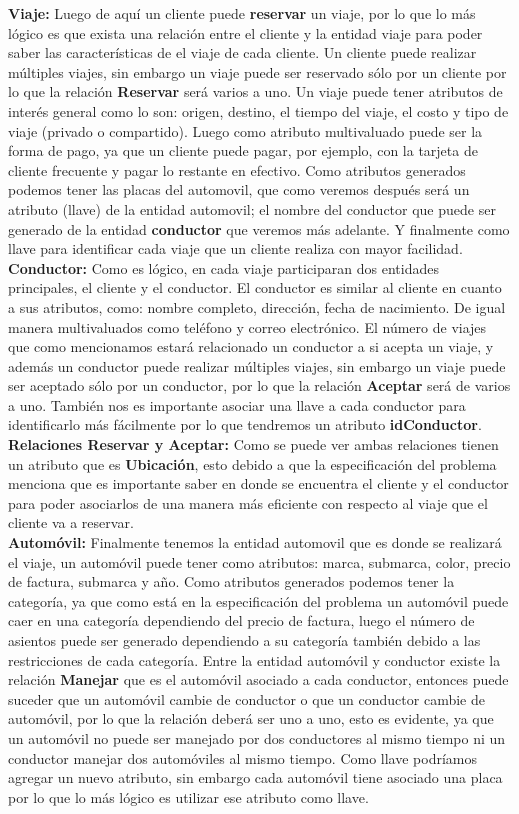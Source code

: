 \documentclass{article}
\begin{document}
\textbf{Viaje:} Luego de aquí un cliente puede \textbf{reservar} un viaje, por lo que lo más lógico es que exista una relación entre el cliente y la entidad viaje para poder saber las características de el viaje de cada cliente. Un cliente puede realizar múltiples viajes, sin embargo un viaje puede ser reservado sólo por un cliente por lo que la relación \textbf{Reservar} será varios a uno. Un viaje puede tener atributos de interés general como lo son: origen, destino, el tiempo del viaje, el costo y tipo de viaje (privado o compartido). Luego como atributo multivaluado puede ser la forma de pago, ya que un cliente puede pagar, por ejemplo, con la tarjeta de cliente frecuente y pagar lo restante en efectivo. Como atributos generados podemos tener las placas del automovil, que como veremos después será un atributo (llave) de la entidad automovil; el nombre del conductor que puede ser generado de la entidad \textbf{conductor} que veremos más adelante. Y finalmente como llave para identificar cada viaje que un cliente realiza con mayor facilidad.\\
\textbf{Conductor:} Como es lógico, en cada viaje participaran dos entidades principales, el cliente y el conductor. El conductor es similar al cliente en cuanto a sus atributos, como: nombre completo, dirección, fecha de nacimiento. De igual manera multivaluados como teléfono y correo electrónico. El número de viajes que como mencionamos estará relacionado un conductor a si acepta un viaje, y además un conductor puede realizar múltiples viajes, sin embargo un viaje puede ser aceptado sólo por un conductor, por lo que la relación \textbf{Aceptar} será de varios a uno. También nos es importante asociar una llave a cada conductor para identificarlo más fácilmente por lo que tendremos un atributo \textbf{idConductor}.\\
\textbf{Relaciones Reservar y Aceptar:} Como se puede ver ambas relaciones tienen un atributo que es \textbf{Ubicación}, esto debido a que la especificación del problema menciona que es importante saber en donde se encuentra el cliente y el conductor para poder asociarlos de una manera más eficiente con respecto al viaje que el cliente va a reservar.\\
\textbf{Automóvil:} Finalmente tenemos la entidad automovil que es donde se realizará el viaje, un automóvil puede tener como atributos: marca, submarca, color, precio de factura, submarca y año. Como atributos generados podemos tener la categoría, ya que como está en la especificación del problema un automóvil puede caer en una categoría dependiendo del precio de factura, luego el número de asientos puede ser generado dependiendo a su categoría también debido a las restricciones de cada categoría. Entre la entidad automóvil y conductor existe la relación \textbf{Manejar} que es el automóvil asociado a cada conductor, entonces puede suceder que un automóvil cambie de conductor o que un conductor cambie de automóvil, por lo que la relación deberá ser uno a uno, esto es evidente, ya que un automóvil no puede ser manejado por dos conductores al mismo tiempo ni un conductor manejar dos automóviles al mismo tiempo. Como llave podríamos agregar un nuevo atributo, sin embargo cada automóvil tiene asociado una placa por lo que lo más lógico es utilizar ese atributo como llave.\\
\end{document}
